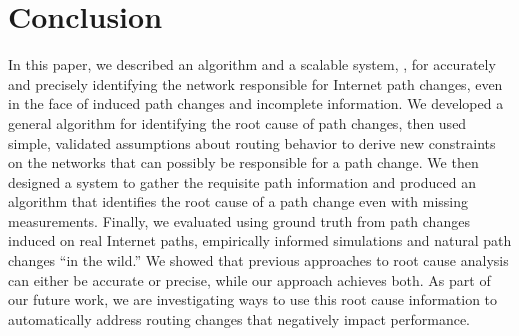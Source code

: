 \section{Conclusion}
\label{sec:conclusion}

In this paper, we described an algorithm and a scalable system, \ouralgo, for accurately and precisely 
identifying the network responsible for Internet path changes, even in the face of 
induced path changes and incomplete information. We developed a general algorithm for identifying the root 
cause of path changes, then used simple, validated assumptions about routing behavior 
to derive new constraints on the networks that can possibly be responsible for a path change. 
We then designed a system to gather the requisite path information and produced an 
algorithm that identifies the root cause of a path change even with missing measurements. Finally, 
we evaluated \ouralgo using ground truth from path changes induced on real Internet 
paths, empirically informed simulations and natural path changes ``in the wild.'' We showed 
that previous approaches to root cause analysis can either be accurate or precise, while our 
approach achieves both. As part of our future work, we are investigating ways to use 
this root cause information to automatically address routing changes that negatively impact 
performance.
